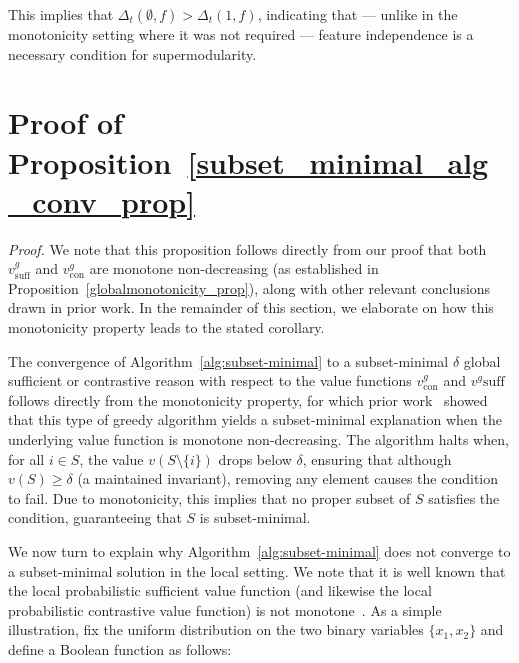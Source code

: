 \documentclass{article}
\begin{document}
This implies that $\Delta_{t}(\emptyset,f) > \Delta_{t}({1},f)$, indicating that --- unlike in the monotonicity setting where it was not required --- feature independence is a necessary condition for supermodularity.





\section{Proof of Proposition~\ref{subset_minimal_alg_conv_prop}}
\label{subset_minimal_alg_conv_prop_sec}

\subsetminimalalgconv*

\emph{Proof.} We note that this proposition follows directly from our proof that both $v^g_{\text{suff}}$ and $v^g_{\text{con}}$ are monotone non-decreasing (as established in Proposition~\ref{globalmonotonicity_prop}), along with other relevant conclusions drawn in prior work. In the remainder of this section, we elaborate on how this monotonicity property leads to the stated corollary.

The convergence of Algorithm~\ref{alg:subset-minimal} to a subset-minimal $\delta$ global sufficient or contrastive reason with respect to the value functions $v^{g}_{\text{con}}$ and $v^{g}{\text{suff}}$ follows directly from the monotonicity property, for which prior work~\citep{ignatiev2019abduction, wu2024verix, arenas2022computing} showed that this type of greedy algorithm yields a subset-minimal explanation when the underlying value function is monotone non-decreasing. The algorithm halts when, for all $i \in S$, the value $v(S \setminus \{i\})$ drops below $\delta$, ensuring that although $v(S) \geq \delta$ (a maintained invariant), removing any element causes the condition to fail. Due to monotonicity, this implies that no proper subset of $S$ satisfies the condition, guaranteeing that $S$ is subset-minimal.

We now turn to explain why Algorithm~\ref{alg:subset-minimal} does not converge to a subset-minimal solution in the local setting. We note that it is well known that the local probabilistic sufficient value function 
(and likewise the local probabilistic contrastive value function) is not monotone~\cite{arenas2022computing, izza2023computing, subercaseaux2024probabilistic, izza2024locally}. As a simple illustration, fix the uniform distribution on the two binary variables $\{x_1, x_2\}$ and define a Boolean function as follows:
\end{document}
